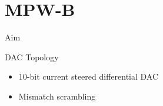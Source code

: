 \documentclass[10pt]{beamer}
\begin{document}
\section*{MPW-B}
\frame{\sectionpage}

\begin{frame}{Aim}

\begin{figure}[h]
\end{figure}

\end{frame}


\begin{frame}{DAC Topology}

\begin{figure}[h]
\end{figure}

\begin{itemize}
 \item 10-bit current steered differential DAC
 \item Mismatch scrambling
\end{itemize}

\end{frame}
\end{document}
